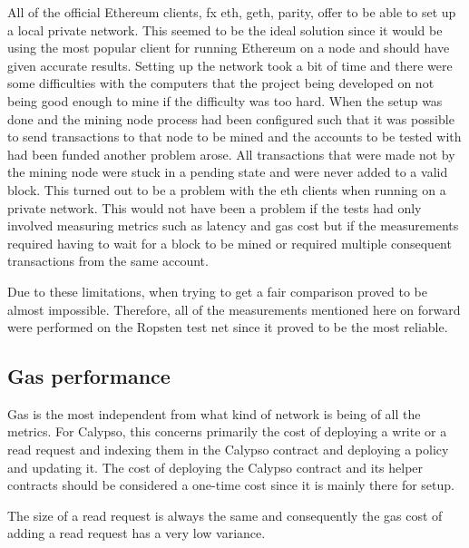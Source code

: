 \documentclass[12pt]{article}
\begin{document}
All of the official Ethereum clients, fx eth, geth, parity, offer to be able to set up a local private network. This seemed to be the ideal solution since it would be using the most popular client for running Ethereum on a node and should have given accurate results. Setting up the network took a bit of time and there were some difficulties with the computers that the project being developed on not being good enough to mine if the difficulty was too hard. When the setup was done and the mining node process had been configured such that it was possible to send transactions to that node to be mined and the accounts to be tested with had been funded another problem arose. All transactions that were made not by the mining node were stuck in a pending state and were never added to a valid block. This turned out to be a problem with the eth clients when running on a private network. This would not have been a problem if the tests had only involved measuring metrics such as latency and gas cost but if the measurements required having to wait for a block to be mined or required multiple consequent transactions from the same account.

Due to these limitations, when trying to get a fair comparison proved to be almost impossible. Therefore, all of the measurements mentioned here on forward were performed on the Ropsten test net since it proved to be the most reliable.

\subsection{Gas performance}
Gas is the most independent from what kind of network is being of all the metrics. For Calypso, this concerns primarily the cost of deploying a write or a read request and indexing them in the Calypso contract and deploying a policy and updating it. The cost of deploying the Calypso contract and its helper contracts should be considered a one-time cost since it is mainly there for setup. 

The size of a read request is always the same and consequently the gas cost of adding a read request has a very low variance.
\end{document}
